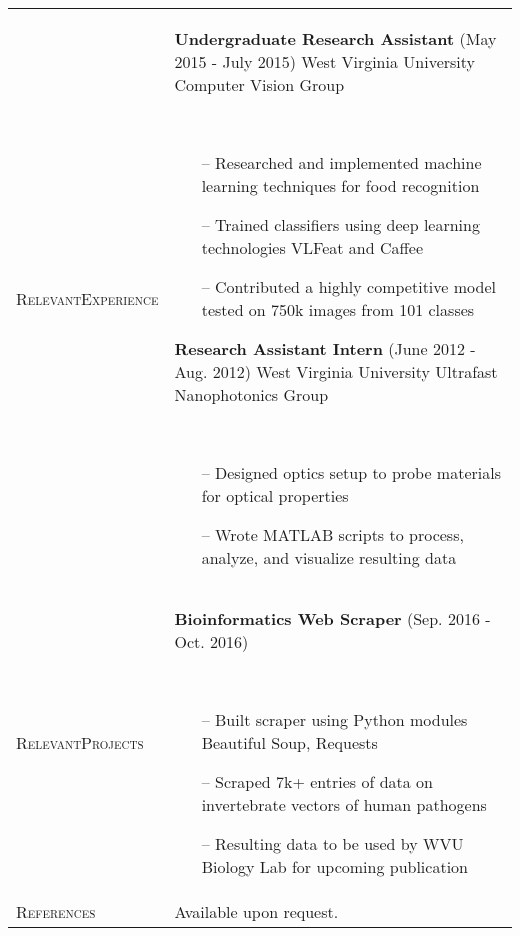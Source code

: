\documentclass{article}
\begin{document}
\begin{tabular}{@{}p{2.5cm}@{\hspace{0.2cm}}p{13cm}@{}}
    \enspace\textsc{Relevant}\newline\textsc{Experience} &
    \enspace\textbf{Undergraduate Research Assistant}
    \hfill\small(May 2015 - July 2015)\normalsize
    \newline West Virginia University Computer Vision Group
    \par\,\small
        \begin{itemize}[leftmargin=*,nolistsep,noitemsep]
        \item[--]Researched and implemented machine learning techniques for food recognition
        \item[--]Trained classifiers using deep learning technologies VLFeat and Caffee
        \item[--]Contributed a highly competitive model tested on 750k images from 101 classes
        \newline
        \end{itemize}
    \normalsize
    \textbf{Research Assistant Intern}
    \hfill\small(June 2012 - Aug. 2012)\normalsize
    \newline West Virginia University Ultrafast Nanophotonics Group
    \par\,\small
      \begin{itemize}[leftmargin=*,nolistsep,noitemsep]
      \item[--]Designed optics setup to probe materials for optical properties
      \item[--]Wrote MATLAB scripts to process, analyze, and visualize resulting data
      \end{itemize}\\
    \normalsize

    \textsc{Relevant}\newline\textsc{Projects} &
    \textbf{Bioinformatics Web Scraper}
    \hfill\small(Sep. 2016 - Oct. 2016)\normalsize
    \par\,\small
        \begin{itemize}[leftmargin=*,nolistsep,noitemsep]
        \item[--]Built scraper using Python modules Beautiful Soup, Requests
        \item[--]Scraped 7k+ entries of data on invertebrate vectors of human pathogens
        \item[--]Resulting data to be used by WVU Biology Lab for upcoming publication
        \newline
        \end{itemize}\\
    \normalsize

    \textsc{References} &
    Available upon request. \\

  \end{tabular}
\end{document}
